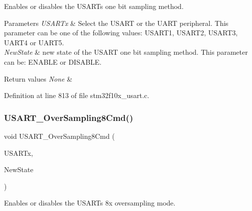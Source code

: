 Enables or disables the U\+S\+A\+RT\textquotesingle{}s one bit sampling method. 


\begin{DoxyParams}{Parameters}
{\em U\+S\+A\+R\+Tx} & Select the U\+S\+A\+RT or the U\+A\+RT peripheral. This parameter can be one of the following values\+: U\+S\+A\+R\+T1, U\+S\+A\+R\+T2, U\+S\+A\+R\+T3, U\+A\+R\+T4 or U\+A\+R\+T5. \\
\hline
{\em New\+State} & new state of the U\+S\+A\+RT one bit sampling method. This parameter can be\+: E\+N\+A\+B\+LE or D\+I\+S\+A\+B\+LE. \\
\hline
\end{DoxyParams}

\begin{DoxyRetVals}{Return values}
{\em None} & \\
\hline
\end{DoxyRetVals}


Definition at line 813 of file stm32f10x\+\_\+usart.\+c.

\mbox{\label{group___u_s_a_r_t___private___functions_ga3897bab07491d9239f8a238a9a7cddea}} 
\subsubsection{\texorpdfstring{U\+S\+A\+R\+T\+\_\+\+Over\+Sampling8\+Cmd()}{USART\_OverSampling8Cmd()}}
{\footnotesize\ttfamily void U\+S\+A\+R\+T\+\_\+\+Over\+Sampling8\+Cmd (\begin{DoxyParamCaption}\item[{\hyperlink{struct_u_s_a_r_t___type_def}{U\+S\+A\+R\+T\+\_\+\+Type\+Def} $\ast$}]{U\+S\+A\+R\+Tx,  }\item[{\hyperlink{group___exported__types_gac9a7e9a35d2513ec15c3b537aaa4fba1}{Functional\+State}}]{New\+State }\end{DoxyParamCaption})}



Enables or disables the U\+S\+A\+RT\textquotesingle{}s 8x oversampling mode. 


